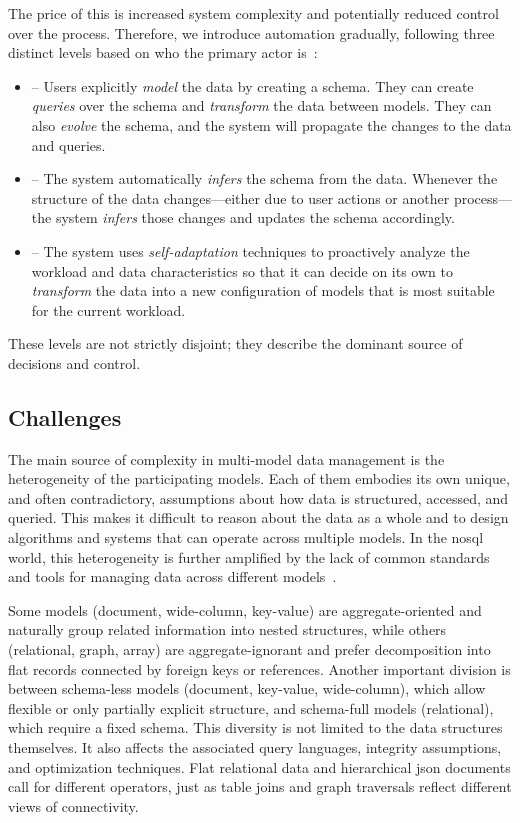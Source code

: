 The price of this is increased system complexity and potentially reduced control over the process. Therefore, we introduce automation gradually, following three distinct levels based on who the primary actor is~\citep{ideas2022vision}:
\begin{itemize}
    \item {} -- Users explicitly \emph{model} the data by creating a schema. They can create \emph{queries} over the schema and \emph{transform} the data between models. They can also \emph{evolve} the schema, and the system will propagate the changes to the data and queries.
    \item {} -- The system automatically \emph{infers} the schema from the data. Whenever the structure of the data changes---either due to user actions or another process---the system \emph{infers} those changes and updates the schema accordingly.
    \item {} -- The system uses \emph{self-adaptation} techniques to proactively analyze the workload and data characteristics so that it can decide on its own to \emph{transform} the data into a new configuration of models that is most suitable for the current workload.
\end{itemize}

These levels are not strictly disjoint; they describe the dominant source of decisions and control.

\subsection{Challenges}

The main source of complexity in multi-model data management is the heterogeneity of the participating models. Each of them embodies its own unique, and often contradictory, assumptions about how data is structured, accessed, and queried. This makes it difficult to reason about the data as a whole and to design algorithms and systems that can operate across multiple models. In the \acrshort{nosql} world, this heterogeneity is further amplified by the lack of common standards and tools for managing data across different models~\citep{Jiaheng2023Survey}.

Some models (document, wide-column, key-value) are aggregate-oriented and naturally group related information into nested structures, while others (relational, graph, array) are aggregate-ignorant and prefer decomposition into flat records connected by foreign keys or references. Another important division is between schema-less models (document, key-value, wide-column), which allow flexible or only partially explicit structure, and schema-full models (relational), which require a fixed schema. This diversity is not limited to the data structures themselves. It also affects the associated query languages, integrity assumptions, and optimization techniques. Flat relational data and hierarchical \acrshort{json} documents call for different operators, just as table joins and graph traversals reflect different views of connectivity.

